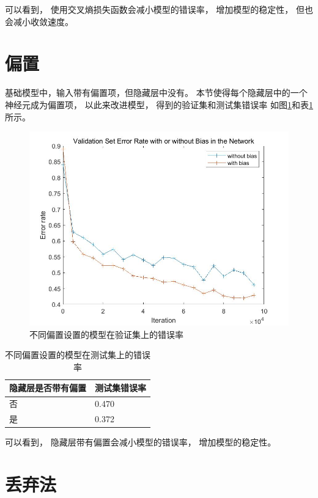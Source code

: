 \documentclass{article}
\begin{document}
可以看到，
使用交叉熵损失函数会减小模型的错误率，
增加模型的稳定性，
但也会减小收敛速度。

\section{偏置}

基础模型中，输入带有偏置项，但隐藏层中没有。
本节使得每个隐藏层中的一个神经元成为偏置项，
以此来改进模型，
得到的验证集和测试集错误率
如图\ref{fig:6}和表\ref{table:6}所示。

\begin{figure}[h]
\includegraphics[width=\textwidth]{6.jpg}
\caption{不同偏置设置的模型在验证集上的错误率}
\label{fig:6}
\end{figure}

\begin{table}[h]
\centering
\begin{tabular}{|l|l|} 
\hline
隐藏层是否带有偏置 & 测试集错误率 \\
\hline
否 & 0.470 \\
是 & 0.372 \\
\hline
\end{tabular}
\caption{不同偏置设置的模型在测试集上的错误率}
\label{table:6}
\end{table}

可以看到，
隐藏层带有偏置会减小模型的错误率，
增加模型的稳定性。

\section{丢弃法}
\end{document}
